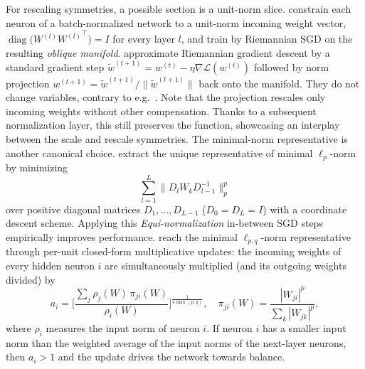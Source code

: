 \documentclass[mathematics,review,submit,moreauthors]{Definitions/mdpi}
\begin{document}
For rescaling symmetries, a possible section is a unit-norm slice.
\citet{badrinarayanan2015} constrain each neuron of a batch-normalized network to a unit-norm incoming weight vector, $\operatorname{diag}\big(W^{(l)}{W^{(l)}}^{\top}\big)=I$ for every layer $l$, and train by Riemannian SGD on the resulting \emph{oblique manifold}.
\citet{huang2017} approximate Riemannian gradient descent by a standard gradient step $\tilde{w}^{(t+1)}=w^{(t)}-\eta\nabla\mathcal{L}(w^{(t)})$ followed by norm projection $w^{(t+1)}=\tilde{w}^{(t+1)}/\lVert\tilde{w}^{(t+1)}\rVert$ back onto the manifold.
They do not change variables, contrary to e.g.\ \citep{salimans2016anips}.
Note that the projection rescales only incoming weights without other compensation.
Thanks to a subsequent normalization layer, this still preserves the function, showcasing an interplay between the scale and rescale symmetries.
The minimal-norm representative is another canonical choice.
\citet{stock2018} extract the unique representative of minimal $\ell_p$-norm by minimizing
\begin{equation*}
    \sum_{l=1}^{L}\big\lVert D_{l}W_{k}D_{l-1}^{-1}\big\rVert_p^p
\end{equation*}
over positive diagonal matrices $D_1,\dots,D_{L-1}$ ($D_0=D_L=I$) with a coordinate descent scheme.
Applying this \emph{Equi-normalization} in-between SGD steps empirically improves performance.
\citet{saul2023} reach the minimal $\ell_{p,q}$-norm representative through per-unit closed-form multiplicative updates: the incoming weights of every hidden neuron $i$ are simultaneously multiplied (and its outgoing weights divided) by
\begin{equation*}
    a_i=\Bigg[\frac{\sum_{j}\rho_j(W)\,\pi_{ji}(W)}{\rho_i(W)}\Bigg]^{\frac{1}{4\max(p,q)}} ,
    \quad
    \pi_{ji}(W)=\frac{|W_{ji}|^p}{\sum_{k}|W_{jk}|^p},
\end{equation*}
where $\rho_i$ measures the input norm of neuron $i$.
If neuron $i$ has a smaller input norm than the weighted average of the input norms of the next-layer neurons, then $a_i>1$ and the update drives the network towards balance.
\end{document}
